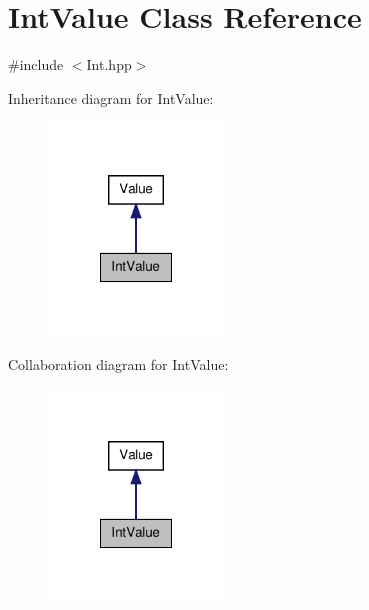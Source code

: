 \hypertarget{class_int_value}{\section{Int\-Value Class Reference}
\label{class_int_value}
}


{\ttfamily \#include $<$Int.\-hpp$>$}



Inheritance diagram for Int\-Value\-:
\nopagebreak
\begin{figure}[H]
\begin{center}
\leavevmode
\includegraphics[width=132pt]{class_int_value__inherit__graph}
\end{center}
\end{figure}


Collaboration diagram for Int\-Value\-:
\nopagebreak
\begin{figure}[H]
\begin{center}
\leavevmode
\includegraphics[width=132pt]{class_int_value__coll__graph}
\end{center}
\end{figure}

